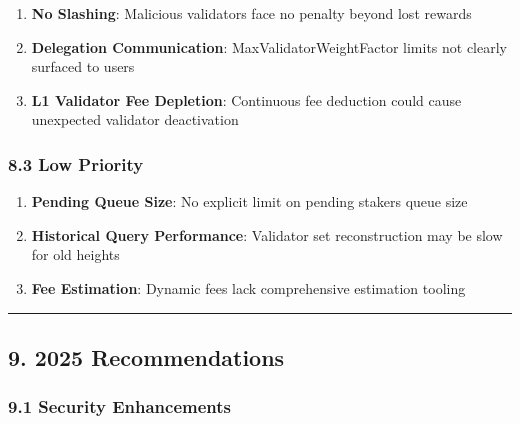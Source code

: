 \documentclass[
]{article}
\providecommand{\tightlist}{%
  \setlength{\itemsep}{0pt}\setlength{\parskip}{0pt}}
\begin{document}
\begin{enumerate}
\def\labelenumi{\arabic{enumi}.}
\tightlist
\item
  \textbf{No Slashing}: Malicious validators face no penalty beyond lost
  rewards
\item
  \textbf{Delegation Communication}: MaxValidatorWeightFactor limits not
  clearly surfaced to users
\item
  \textbf{L1 Validator Fee Depletion}: Continuous fee deduction could
  cause unexpected validator deactivation
\end{enumerate}

\subsubsection{8.3 Low Priority}\label{83-low-priority}

\begin{enumerate}
\def\labelenumi{\arabic{enumi}.}
\tightlist
\item
  \textbf{Pending Queue Size}: No explicit limit on pending stakers
  queue size
\item
  \textbf{Historical Query Performance}: Validator set reconstruction
  may be slow for old heights
\item
  \textbf{Fee Estimation}: Dynamic fees lack comprehensive estimation
  tooling
\end{enumerate}

\begin{center}\rule{0.5\linewidth}{0.5pt}\end{center}

\subsection{9. 2025 Recommendations}\label{9-2025-recommendations}

\subsubsection{9.1 Security
Enhancements}\label{91-security-enhancements}
\end{document}
